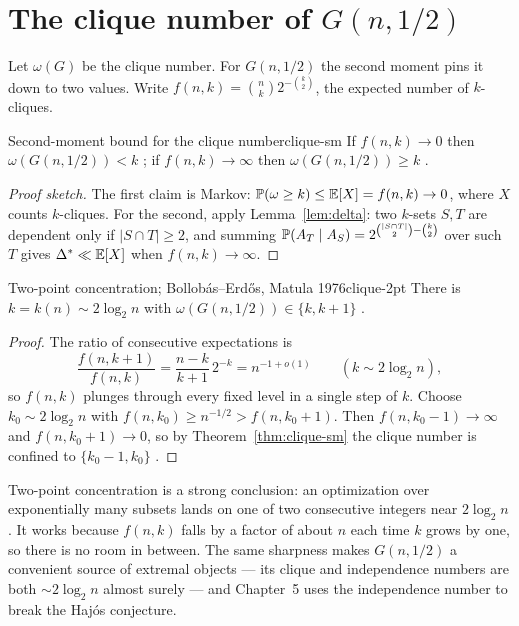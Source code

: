 \section{The clique number of \texorpdfstring{$G(n,1/2)$}{G(n,1/2)}}

Let $\omega(G)$ be the clique number. For $G(n,1/2)$ the second moment pins it
down to two values. Write $f(n,k)=\binom nk 2^{-\binom k2}$, the expected number
of $k$-cliques.

\begin{theorem}{Second-moment bound for the clique number}{clique-sm}
If $f(n,k)\to0$ then $\omega(G(n,1/2))<k$ \whp; if $f(n,k)\to\infty$ then
$\omega(G(n,1/2))\ge k$ \whp.
\end{theorem}

\begin{proof}[Proof sketch]
The first claim is Markov: $\mathbb{P}(\omega\ge k)\le\mathbb{E}[X]=f(n,k)\to0$, where $X$
counts $k$-cliques. For the second, apply Lemma~\ref{lem:delta}: two $k$-sets
$S,T$ are dependent only if $|S\cap T|\ge2$, and summing
$\mathbb{P}(A_T\mid A_S)=2^{\binom{|S\cap T|}2-\binom k2}$ over such $T$ gives
$\Delta^\ast\ll\mathbb{E}[X]$ when $f(n,k)\to\infty$.
\end{proof}

\begin{theorem}{Two-point concentration; Bollob\'as--Erd\H{o}s, Matula 1976}{clique-2pt}
There is $k=k(n)\sim 2\log_2 n$ with
$\omega(G(n,1/2))\in\{k,k+1\}$ \whp.
\end{theorem}

\begin{proof}
The ratio of consecutive expectations is
\[
  \frac{f(n,k+1)}{f(n,k)}=\frac{n-k}{k+1}\,2^{-k}=n^{-1+o(1)}
  \qquad(k\sim2\log_2 n),
\]
so $f(n,k)$ plunges through every fixed level in a single step of $k$. Choose
$k_0\sim2\log_2 n$ with $f(n,k_0)\ge n^{-1/2}>f(n,k_0+1)$. Then
$f(n,k_0-1)\to\infty$ and $f(n,k_0+1)\to0$, so by Theorem~\ref{thm:clique-sm}
the clique number is confined to $\{k_0-1,k_0\}$ \whp.
\end{proof}

\begin{insight}
Two-point concentration is a strong conclusion: an optimization over
exponentially many subsets lands on one of two consecutive integers near
$2\log_2 n$. It works because $f(n,k)$ falls by a factor of about $n$ each time
$k$ grows by one, so there is no room in between. The same sharpness makes
$G(n,1/2)$ a convenient source of extremal objects --- its clique and independence
numbers are both $\sim2\log_2 n$ almost surely --- and Chapter~5 uses the
independence number to break the Haj\'os conjecture.
\end{insight}

